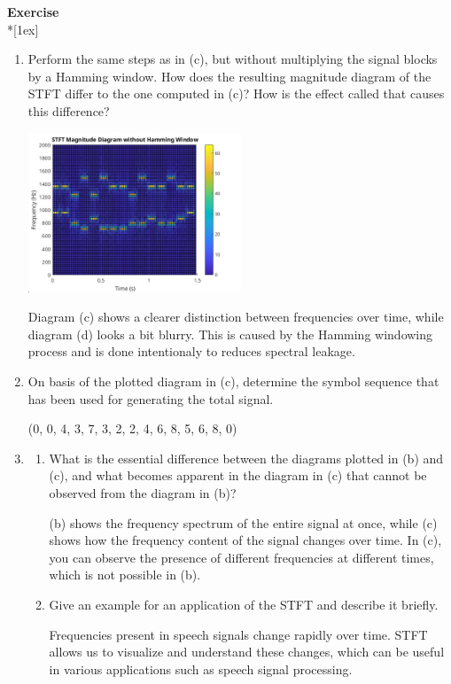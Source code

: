 \documentclass[12pt,a4paper,austrian]{article}
\newcounter{theaufgabe}\setcounter{theaufgabe}{1}
\newenvironment{aufgabe}[1]%
  {\bigskip\par\noindent\begin{nopagebreak}
   \textsf{\textbf{Exercise \arabic{theaufgabe}}}\quad
      \textsf{\textit{#1}}\\*[1ex]%
\stepcounter{theaufgabe}\hspace{2ex}\end{nopagebreak}}
  {\par\pagebreak[2]}
\begin{document}
\begin{aufgabe}{}
\begin{enumerate}
    \item Perform the same steps as in (c), but without multiplying the signal blocks by a Hamming window. 
    How does the resulting magnitude diagram of the STFT differ to the one computed in (c)? 
    How is the effect called that causes this difference?

    \includegraphics[width=0.5\textwidth]{../Ex04_d.jpg}

    Diagram (c) shows a clearer distinction between frequencies over time, while diagram (d) looks a bit blurry. 
    This is caused by the Hamming windowing process and is done intentionaly to reduces spectral leakage.

    \item On basis of the plotted diagram in (c), determine the symbol sequence that has been used
    for generating the total signal.

    \smallskip

    (0, 0, 4, 3, 7, 3, 2, 2, 4, 6, 8, 5, 6, 8, 0)

    \item
      \begin{enumerate}
        \item What is the essential difference between the diagrams plotted in (b) and (c), and what
        becomes apparent in the diagram in (c) that cannot be observed from the diagram in (b)?

        \smallskip
        (b) shows the frequency spectrum of the entire signal at once, 
        while (c) shows how the frequency content of the signal changes over time. 
        In (c), you can observe the presence of different frequencies at different times, which is not possible in (b).

        \item Give an example for an application of the STFT and describe it briefly.
        
        \smallskip
        Frequencies present in speech signals change rapidly over time.
        STFT allows us to visualize and understand these changes, 
        which can be useful in various applications such as speech signal processing.


      \end{enumerate}
        

  \end{enumerate}

\end{aufgabe} \pagebreak
\end{document}
